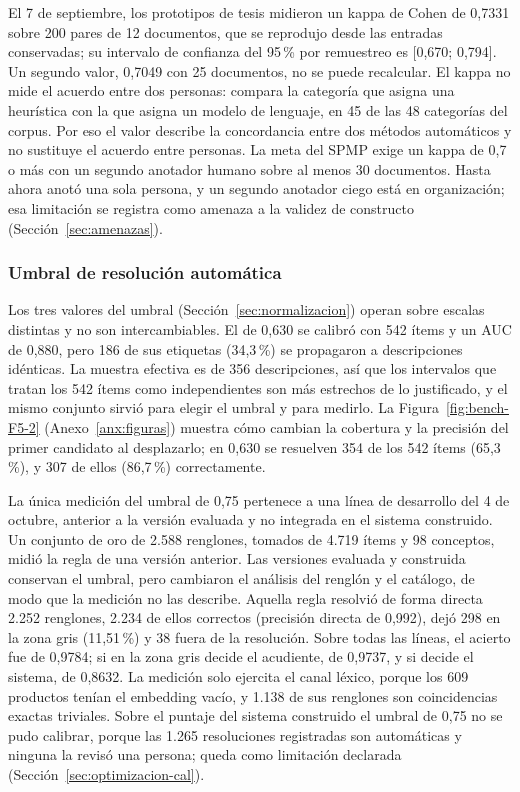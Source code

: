 El 7 de septiembre, los prototipos de tesis midieron un kappa de Cohen de 0,7331 sobre 200 pares de
12 documentos, que se reprodujo desde las entradas conservadas; su intervalo de confianza del
95\,\% por remuestreo es [0,670; 0,794]. Un segundo valor, 0,7049 con 25 documentos, no se puede
recalcular. El kappa no mide el acuerdo entre dos personas: compara la categoría que asigna una
heurística con la que asigna un modelo de lenguaje, en 45 de las 48 categorías del corpus. Por eso
el valor describe la concordancia entre dos métodos automáticos y no sustituye el acuerdo entre
personas. La meta del SPMP exige un kappa de 0,7 o más con un segundo anotador humano sobre al
menos 30 documentos. Hasta ahora anotó una sola persona, y un segundo anotador ciego está en
organización; esa limitación se
registra como amenaza a la validez de constructo (Sección~\ref{sec:amenazas}).

\subsubsection{Umbral de resolución automática}

Los tres valores del umbral (Sección~\ref{sec:normalizacion}) operan sobre escalas distintas y no
son intercambiables. El de 0,630 se calibró con 542 ítems y un AUC de 0,880, pero 186 de sus
etiquetas (34,3\,\%) se propagaron a descripciones idénticas. La muestra efectiva es de 356
descripciones, así que los intervalos que tratan los 542 ítems como independientes son más estrechos
de lo justificado, y el mismo conjunto sirvió para elegir el umbral y para medirlo. La
Figura~\ref{fig:bench-F5-2} (Anexo~\ref{anx:figuras}) muestra cómo cambian la cobertura y la precisión del primer candidato
al desplazarlo; en 0,630 se resuelven 354 de los 542 ítems (65,3\,\%), y 307 de ellos (86,7\,\%)
correctamente.

La única medición del umbral de 0,75 pertenece a una línea de desarrollo del 4 de octubre, anterior
a la versión evaluada y no integrada en el sistema construido. Un conjunto de oro de 2.588
renglones, tomados de 4.719 ítems y 98 conceptos, midió la regla de una versión anterior. Las
versiones evaluada y construida conservan el umbral, pero cambiaron el análisis del renglón y el
catálogo, de modo que la medición no las describe. Aquella regla resolvió de forma directa 2.252 renglones, 2.234 de ellos
correctos (precisión directa de 0,992), dejó 298 en la zona gris (11,51\,\%) y 38 fuera de la
resolución. Sobre todas las líneas, el acierto fue de 0,9784; si en la zona gris decide el
acudiente, de 0,9737, y si decide el sistema, de 0,8632. La medición solo ejercita el canal léxico,
porque los 609 productos tenían el embedding vacío, y 1.138 de sus renglones son coincidencias
exactas triviales. Sobre el puntaje del sistema construido el umbral de 0,75 no se pudo calibrar, porque las 1.265
resoluciones registradas son automáticas y ninguna la revisó una persona; queda como limitación
declarada (Sección~\ref{sec:optimizacion-cal}).

